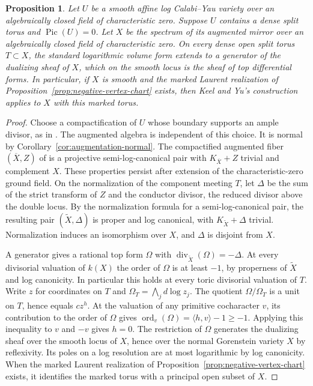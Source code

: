 \documentclass[11pt,reqno]{amsart}
\numberwithin{equation}{section}
\newtheorem{proposition}[theorem]{Proposition}
\theoremstyle{definition}
\theoremstyle{remark}
\DeclareMathOperator{\Pic}{Pic}
\begin{document}
\begin{proposition}\label{prop:reverse-volume-automatic}
Let \(U\) be a smooth affine log Calabi--Yau variety over an
algebraically closed field of characteristic zero. Suppose \(U\) contains
a dense split torus and \(\Pic(U)=0\). Let \(X\) be the spectrum of its
augmented mirror over an algebraically closed field of characteristic
zero. On every dense open split torus \(T\subset X\),
the standard logarithmic volume form extends to a generator of the
dualizing sheaf of \(X\), which on the smooth locus is the sheaf of
top differential forms. In particular, if \(X\) is smooth and the
marked Laurent realization of Proposition~\ref{prop:negative-vertex-chart}
exists, then Keel and Yu's construction applies to \(X\) with this marked torus.
\end{proposition}
\begin{proof}
Choose a compactification of \(U\) whose boundary supports an ample
divisor, as in \cite[Lemma~19.2]{KY}. The augmented algebra is
independent of this choice. It is normal by
Corollary~\ref{cor:augmentation-normal}. The compactified augmented
fiber \((\overline X,Z)\) of \cite[Proposition~19.1]{KY} is a
projective semi-log-canonical pair with \(K_{\overline X}+Z\) trivial
and complement \(X\). These properties persist after extension of the
characteristic-zero ground field. On the normalization of the component
meeting \(T\), let \(\Delta\) be the sum of the strict transform of
\(Z\) and the conductor divisor, the reduced divisor above the double
locus. By the normalization formula for a semi-log-canonical pair,
the resulting pair \((\widetilde X,\Delta)\) is proper and log
canonical, with \(K_{\widetilde X}+\Delta\) trivial. Normalization induces an
isomorphism over \(X\), and \(\Delta\) is disjoint from \(X\).

A generator gives a rational top form \(\Omega\) with
\(\operatorname{div}_{\widetilde X}(\Omega)=-\Delta\). At every divisorial
valuation of \(k(X)\) the order of \(\Omega\) is at least \(-1\), by
properness of \(\widetilde X\) and log canonicity. In particular this holds at
every toric divisorial valuation of \(T\). Write \(z\) for coordinates
on \(T\) and \(\Omega_T=\bigwedge_j d\log z_j\). The quotient
\(\Omega/\Omega_T\) is a unit on \(T\), hence equals \(c z^h\).
At the valuation of any primitive cocharacter \(v\), its contribution
to the order of \(\Omega\) gives
\(\operatorname{ord}_v(\Omega)=\langle h,v\rangle-1\ge-1\).
Applying this inequality to \(v\) and \(-v\) gives \(h=0\).
The restriction of \(\Omega\) generates the dualizing sheaf over the
smooth locus of \(X\), hence over the normal Gorenstein variety \(X\)
by reflexivity. Its poles on a log resolution are at most logarithmic by log canonicity.
When the marked Laurent realization of
Proposition~\ref{prop:negative-vertex-chart} exists, it identifies
the marked torus with a principal open subset of \(X\).
\end{proof}
\end{document}
